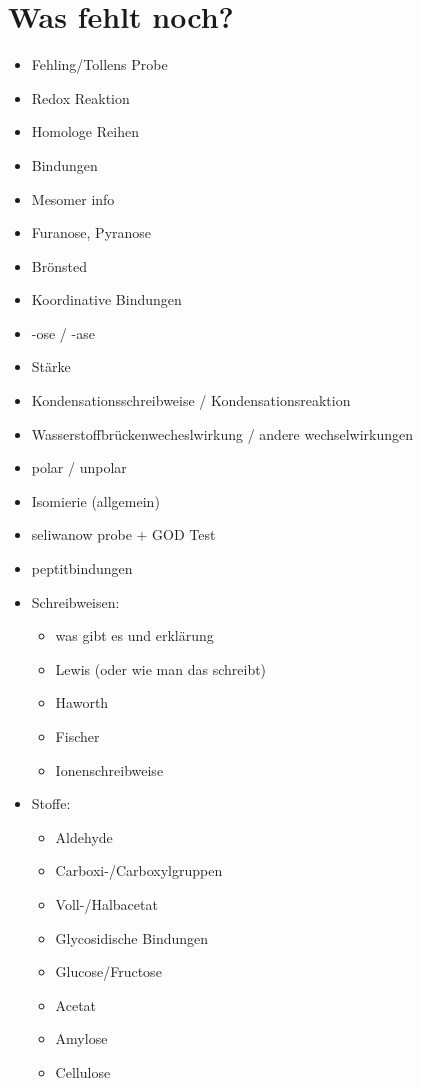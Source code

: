 
\chapter{Was fehlt noch?}
\begin{itemize}
    \item Fehling/Tollens Probe
    \item Redox Reaktion
    \item Homologe Reihen
    \item Bindungen
    \item Mesomer info
    \item Furanose, Pyranose
    \item Brönsted
    \item Koordinative Bindungen
    \item -ose / -ase
    \item Stärke
    \item Kondensationsschreibweise / Kondensationsreaktion
    \item Wasserstoffbrückenwecheslwirkung / andere wechselwirkungen
    \item polar / unpolar
    \item Isomierie (allgemein)
    \item seliwanow probe + GOD Test
    \item peptitbindungen

    \item Schreibweisen:
    \begin{itemize}
        \item was gibt es und erklärung
        \item Lewis (oder wie man das schreibt)
        \item Haworth
        \item Fischer
        \item Ionenschreibweise
    \end{itemize}

    \item Stoffe:
    \begin{itemize}
        \item Aldehyde
        \item Carboxi-/Carboxylgruppen
        \item Voll-/Halbacetat
        \item Glycosidische Bindungen
        \item Glucose/Fructose
        \item Acetat
        \item Amylose
        \item Cellulose
    \end{itemize}
\end{itemize}

